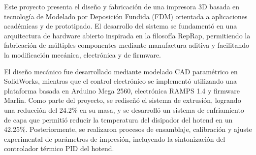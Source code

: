 Este proyecto presenta el diseño y fabricación de una impresora 3D basada en tecnología de Modelado por Deposición Fundida (FDM) orientada a aplicaciones académicas y de prototipado. El desarrollo del sistema se fundamentó en una arquitectura de hardware abierto inspirada en la filosofía RepRap, permitiendo la fabricación de múltiples componentes mediante manufactura aditiva y facilitando la modificación mecánica, electrónica y de firmware.

El diseño mecánico fue desarrollado mediante modelado CAD paramétrico en SolidWorks, mientras que el control electrónico se implementó utilizando una plataforma basada en Arduino Mega 2560, electrónica RAMPS 1.4 y firmware Marlin. Como parte del proyecto, se rediseñó el sistema de extrusión, logrando una reducción del 24.2\% en su masa, y se desarrolló un sistema de enfriamiento de capa que permitió reducir la temperatura del disipador del hotend en un 42.25\%. Posteriormente, se realizaron procesos de ensamblaje, calibración y ajuste experimental de parámetros de impresión, incluyendo la sintonización del controlador térmico PID del hotend. 

